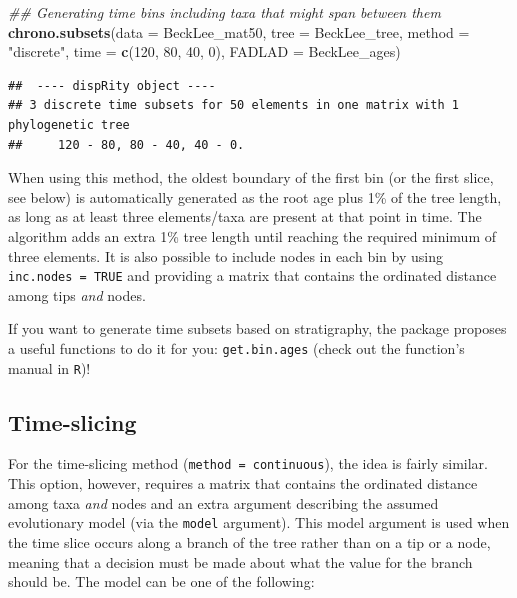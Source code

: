 \documentclass[]{book}
\newenvironment{Shaded}{\begin{snugshade}}{\end{snugshade}}
\newcommand{\CommentTok}[1]{\textcolor[rgb]{0.56,0.35,0.01}{\textit{#1}}}
\newcommand{\DataTypeTok}[1]{\textcolor[rgb]{0.13,0.29,0.53}{#1}}
\newcommand{\DecValTok}[1]{\textcolor[rgb]{0.00,0.00,0.81}{#1}}
\newcommand{\KeywordTok}[1]{\textcolor[rgb]{0.13,0.29,0.53}{\textbf{#1}}}
\newcommand{\NormalTok}[1]{#1}
\newcommand{\StringTok}[1]{\textcolor[rgb]{0.31,0.60,0.02}{#1}}
\begin{document}
\begin{Shaded}
\begin{Highlighting}[]
\CommentTok{## Generating time bins including taxa that might span between them}
\KeywordTok{chrono.subsets}\NormalTok{(}\DataTypeTok{data =}\NormalTok{ BeckLee_mat50, }\DataTypeTok{tree =}\NormalTok{ BeckLee_tree,}
               \DataTypeTok{method =} \StringTok{"discrete"}\NormalTok{,}
               \DataTypeTok{time =} \KeywordTok{c}\NormalTok{(}\DecValTok{120}\NormalTok{, }\DecValTok{80}\NormalTok{, }\DecValTok{40}\NormalTok{, }\DecValTok{0}\NormalTok{), }\DataTypeTok{FADLAD =}\NormalTok{ BeckLee_ages)}
\end{Highlighting}
\end{Shaded}

\begin{verbatim}
##  ---- dispRity object ---- 
## 3 discrete time subsets for 50 elements in one matrix with 1 phylogenetic tree
##     120 - 80, 80 - 40, 40 - 0.
\end{verbatim}

When using this method, the oldest boundary of the first bin (or the first slice, see below) is automatically generated as the root age plus 1\% of the tree length, as long as at least three elements/taxa are present at that point in time.
The algorithm adds an extra 1\% tree length until reaching the required minimum of three elements.
It is also possible to include nodes in each bin by using \texttt{inc.nodes\ =\ TRUE} and providing a matrix that contains the ordinated distance among tips \emph{and} nodes.

If you want to generate time subsets based on stratigraphy, the package proposes a useful functions to do it for you: \texttt{get.bin.ages} (check out the function's manual in \texttt{R})!

\hypertarget{time-slicing}{%
\subsection{Time-slicing}\label{time-slicing}}

For the time-slicing method (\texttt{method\ =\ continuous}), the idea is fairly similar.
This option, however, requires a matrix that contains the ordinated distance among taxa \emph{and} nodes and an extra argument describing the assumed evolutionary model (via the \texttt{model} argument).
This model argument is used when the time slice occurs along a branch of the tree rather than on a tip or a node, meaning that a decision must be made about what the value for the branch should be.
The model can be one of the following:
\end{document}
